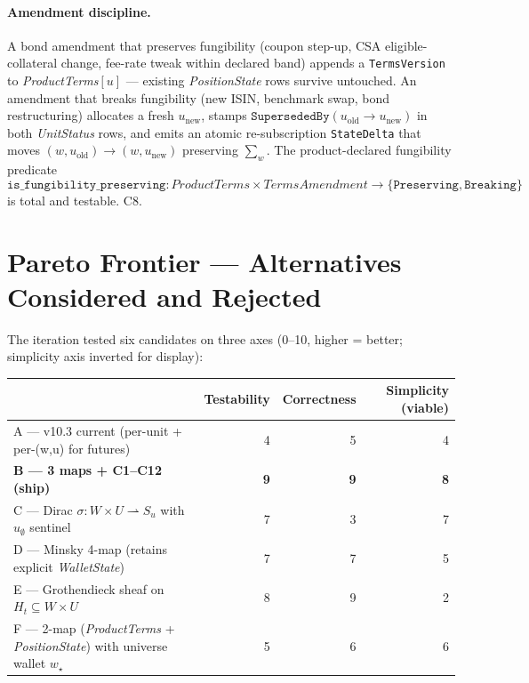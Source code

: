 \documentclass[11pt,a4paper]{article}
\begin{document}
\paragraph{Amendment discipline.} A bond amendment that preserves fungibility (coupon step-up, CSA eligible-collateral change, fee-rate tweak within declared band) appends a \texttt{TermsVersion} to \textit{ProductTerms}$[u]$ --- existing \textit{PositionState} rows survive untouched. An amendment that breaks fungibility (new ISIN, benchmark swap, bond restructuring) allocates a fresh $u_{\mathrm{new}}$, stamps $\texttt{SupersededBy}(u_{\mathrm{old}} \to u_{\mathrm{new}})$ in both \textit{UnitStatus} rows, and emits an atomic re-subscription \texttt{StateDelta} that moves $(w, u_{\mathrm{old}}) \to (w, u_{\mathrm{new}})$ preserving $\sum_w$. The product-declared fungibility predicate
\[
\texttt{is\_fungibility\_preserving} : \textit{ProductTerms} \times \textit{TermsAmendment} \to \{\texttt{Preserving}, \texttt{Breaking}\}
\]
is total and testable. C8.

\section{Pareto Frontier --- Alternatives Considered and Rejected}
\label{sec:pareto}

The iteration tested six candidates on three axes (0--10, higher = better; simplicity axis inverted for display):

\begin{longtable}{p{7cm}rrr}
\toprule
 & \textbf{Testability} & \textbf{Correctness} & \textbf{Simplicity (viable)} \\
\midrule
A --- v10.3 current (per-unit + per-(w,u) for futures) & 4 & 5 & 4 \\
\textbf{B --- 3 maps + C1--C12 (ship)} & \textbf{9} & \textbf{9} & \textbf{8} \\
C --- Dirac $\sigma : W \times U \rightharpoonup S_u$ with $u_\emptyset$ sentinel & 7 & 3 & 7 \\
D --- Minsky 4-map (retains explicit \textit{WalletState}) & 7 & 7 & 5 \\
E --- Grothendieck sheaf on $H_t \subseteq W \times U$ & 8 & 9 & 2 \\
F --- 2-map (\textit{ProductTerms} + \textit{PositionState}) with universe wallet $w_\star$ & 5 & 6 & 6 \\
\bottomrule
\end{longtable}
\end{document}
